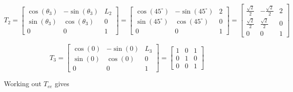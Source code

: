 \documentclass{article}
\begin{document}
\[
	T_2= \begin{bmatrix}
		\cos(\theta_3) & -\sin(\theta_3) & L_2 \\
		\sin(\theta_3) & \cos(\theta_3)  & 0   \\
		0              & 0               & 1
	\end{bmatrix}
	=
	\begin{bmatrix}
		\cos(45^\circ) & -\sin(45^\circ) & 2 \\
		\sin(45^\circ) & \cos(45^\circ)  & 0 \\
		0              & 0               & 1
	\end{bmatrix}
	=
	\begin{bmatrix}
		\frac{\sqrt{2}}{2} & -\frac{\sqrt{2}}{2} & 2 \\
		\frac{\sqrt{2}}{2} & \frac{\sqrt{2}}{2}  & 0 \\
		0                  & 0                   & 1
	\end{bmatrix}
\]

\[
	T_3= \begin{bmatrix}
		\cos(0) & -\sin(0) & L_3 \\
		\sin(0) & \cos(0)  & 0   \\
		0       & 0        & 1
	\end{bmatrix}
	=
	\begin{bmatrix}
		1 & 0 & 1 \\
		0 & 1 & 0 \\
		0 & 0 & 1
	\end{bmatrix}
\]

Working out $T_{ee}$ gives
\end{document}
